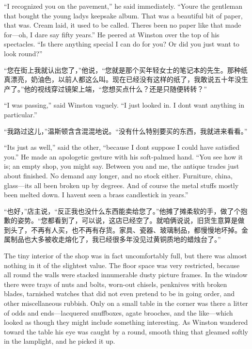 \begin{paracol}{2}
\switchcolumn*

``I recognized you on the pavement,'' he said immediately.
``You\textquotesingle re the gentleman that bought the young
lady\textquotesingle s keepsake album. That was a beautiful bit of
paper, that was. Cream laid, it used to be called.
There\textquotesingle s been no paper like that made for---oh, I dare
say fifty years.'' He peered at Winston over the top of his spectacles.
``Is there anything special I can do for you? Or did you just want to
look round?''

\switchcolumn

``您在街上我就认出您了，''他说，``您就是那个买年轻女士的笔记本的先生。那种纸真漂亮，奶油色，以前人都这么叫。现在已经没有这样的纸了，我敢说五十年没生产了。''他的视线穿过镜架上端，``您想买点什么？还是只随便转转？''

\switchcolumn*

``I was passing,'' said Winston vaguely. ``I just looked in. I
don\textquotesingle t want anything in particular.''

\switchcolumn

``我路过这儿，''温斯顿含含混混地说。``没有什么特别要买的东西，我就进来看看。''

\switchcolumn*

``It\textquotesingle s just as well,'' said the other, ``because I
don\textquotesingle t suppose I could have satisfied you.'' He made an
apologetic gesture with his soft-palmed hand. ``You see how it is; an
empty shop, you might say. Between you and me, the antique
trade\textquotesingle s just about finished. No demand any longer, and
no stock either. Furniture, china, glass---it\textquotesingle s all been
broken up by degrees. And of course the metal stuff\textquotesingle s
mostly been melted down. I haven\textquotesingle t seen a brass
candlestick in years.''

\switchcolumn

``也好，''店主说，``反正我也没什么东西能卖给您了。''他摊了摊柔软的手，做了个抱歉的姿势。``您都看到了，可以说，这店已经空了。就咱俩说说，旧货生意算是做到头了，不再有人买，也不再有存货。家具、瓷器、玻璃制品，都慢慢地坏掉。金属制品也大多被收走熔化了，我已经很多年没见过黄铜质地的蜡烛台了。''

\switchcolumn*

The tiny interior of the shop was in fact uncomfortably full, but there
was almost nothing in it of the slightest value. The floor space was
very restricted, because all round the walls were stacked innumerable
dusty picture frames. In the window there were trays of nuts and bolts,
worn-out chisels, penknives with broken blades, tarnished watches that
did not even pretend to be in going order, and other miscellaneous
rubbish. Only on a small table in the corner was there a litter of odds
and ends---lacquered snuffboxes, agate brooches, and the like---which
looked as though they might include something interesting. As Winston
wandered toward the table his eye was caught by a round, smooth thing
that gleamed softly in the lamplight, and he picked it up.


\end{paracol}
